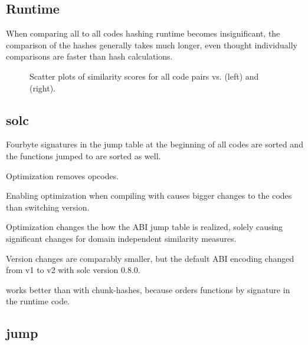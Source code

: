\documentclass[../main.tex]{subfiles}
\begin{document}
\subsection{Runtime}
\begin{obs}
  When comparing all to all codes hashing runtime becomes insignificant, the comparison of the hashes generally takes much longer, even thought individually comparisons are faster than hash calculations.
\end{obs}

\begin{figure}[ht!]
  \centering
  \caption{Scatter plots of  similarity scores for all \n{\solcts} code pairs vs.  (left) and  (right).}
  \label{fig:ncdLzScat}
\end{figure}

\subsection{solc}
\begin{obs}
  Fourbyte signatures in the jump table at the beginning of all codes are sorted and the functions jumped to are sorted as well.
\end{obs}
\begin{obs}
  Optimization removes  opcodes.
\end{obs}
\begin{obs}
  Enabling optimization when compiling with  causes bigger changes to the codes than switching  version.
\end{obs}
\begin{obs}
  Optimization changes the how the ABI jump table is realized, solely causing significant changes for domain independent similarity measures.
\end{obs}
\begin{obs}
  Version changes are comparably smaller, but the default ABI encoding changed from v1 to v2 with solc version 0.8.0.
\end{obs}
\begin{res}
   works better than  with chunk-hashes, because  orders functions by signature in the runtime code.
\end{res}

\subsection{jump}
\end{document}
